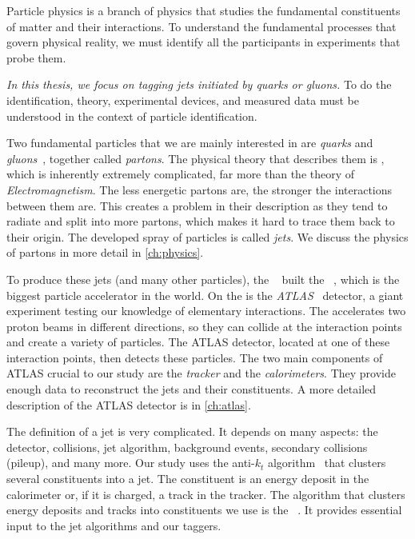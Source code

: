 

Particle physics is a branch of physics that studies the fundamental constituents of matter and their interactions.
To understand the fundamental processes that govern physical reality, we must identify all the participants in experiments that probe them. 

\emph{In this thesis, we focus on tagging jets initiated by quarks or gluons.}
To do the identification, theory, experimental devices, and measured data must be understood in the context of particle identification.

Two fundamental particles that we are mainly interested in are \emph{quarks} and \emph{gluons}~\cite{quarks}, together called \emph{partons}.
The physical theory that describes them is \QCD, which is inherently extremely complicated, far more than the theory of \emph{Electromagnetism}.
The less energetic partons are, the stronger the interactions between them are. 
This creates a problem in their description as they tend to radiate and split into more partons, which makes it hard to trace them back to their origin.
The developed spray of particles is called \emph{jets}.
We discuss the physics of partons in more detail in \cref{ch:physics}.

To produce these jets (and many other particles), the \CERN~\cite{cern} built the \LHC~\cite{LHC}, which is the biggest particle accelerator in the world.
On the \LHC is the \emph{ATLAS}~\cite{ATLAS} detector, a giant experiment testing our knowledge of elementary interactions. 
The \LHC accelerates two proton beams in different directions, so they can collide at the interaction points and create a variety of particles.
The ATLAS detector, located at one of these interaction points, then detects these particles.
The two main components of ATLAS crucial to our study are the \emph{tracker} and the \emph{calorimeters}.
They provide enough data to reconstruct the jets and their constituents.
A more detailed description of the ATLAS detector is in \cref{ch:atlas}.

The definition of a jet is very complicated.
It depends on many aspects: the detector, collisions, jet algorithm, background events, secondary collisions (pileup), and many more.
Our study uses the anti-$k_t$ algorithm~\cite{antikt} that clusters several constituents into a jet.
The constituent is an energy deposit in the calorimeter or, if it is charged, a track in the tracker.
The algorithm that clusters energy deposits and tracks into constituents we use is the \PFa~\cite{PFO}.
It provides essential input to the jet algorithms and our taggers.


